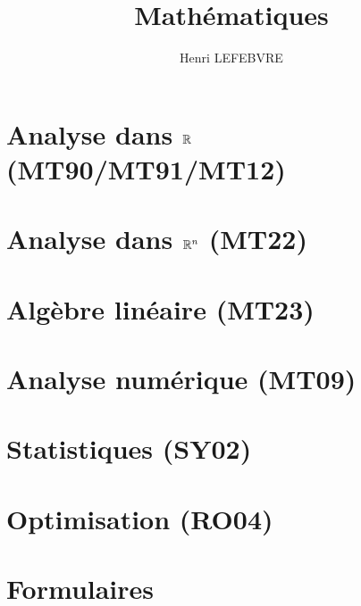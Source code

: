\documentclass[11pt]{report}
\title{Mathématiques}
\author{Henri LEFEBVRE}
\begin{document}
    \maketitle
    \tableofcontents
    
    \chapter{Analyse dans $\mathbb{R}$ \small{(MT90/MT91/MT12)}}
    

    \chapter{Analyse dans $\mathbb{R}^n$ \small{(MT22)}}
    

    \chapter{Algèbre linéaire \small{(MT23)}}
    

    \chapter{Analyse numérique \small{(MT09)}}
    

    \chapter{Statistiques \small{(SY02)}}
    

    \chapter{Optimisation \small{(RO04)}}
    

    \chapter{Formulaires}
    
\end{document}
